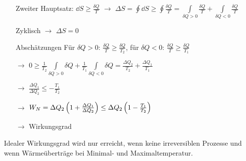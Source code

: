 \begin{itemize}[align=left]
  \item[Zweiter Hauptsatz:] $\dd{S} \geq \frac{\delta Q}{T}$ $\rightarrow$ $\Delta S = \oint \dd{S} \geq \oint \frac{\delta Q}{T} = \int\limits_{\delta Q > 0} \frac{\delta Q}{T} + \int\limits_{\delta Q < 0} \frac{\delta Q} {T}$
  \item[Zyklisch] $\rightarrow$ $\Delta S = 0$
  \item[Abschätzungen] Für $\delta Q > 0$: $\frac{\delta Q}{T} \geq\frac{\delta Q}{T_2}$, für $\delta Q < 0$: $\frac{\delta Q}{T} \geq \frac{\delta Q}{T_1}$
  \item[$\rightarrow$] $0 \geq \frac{1}{T_2} \int\limits_{\delta Q > 0} \delta Q + \frac{1}{T_1} \int\limits_{\delta Q  < 0} \delta Q = \frac{\Delta Q_2}{T_2} +\frac{\Delta Q_1}{T_1}$
  \item[$\rightarrow$] $\frac{\Delta Q_1}{\Delta Q_2} \leq - \frac{T_1}{T_2}$
  \item[$\rightarrow$] $W_N = \Delta Q_2\left( 1 + \frac{\Delta Q_1}{\Delta Q_2} \right) \leq \Delta Q_2\left( 1- \frac{T_1}{T_2} \right)$
  \item[$\rightarrow$] Wirkungsgrad 
\end{itemize}

Idealer Wirkungsgrad wird nur erreicht, wenn keine irreversiblen Prozesse und wenn Wärmeüberträge bei Minimal- und Maximaltemperatur.
